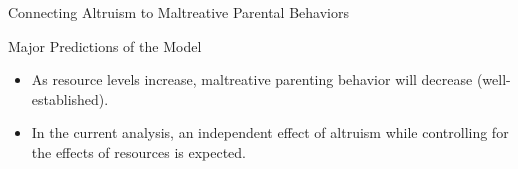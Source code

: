 \documentclass[handout]{beamer}
\begin{document}
\begin{frame}{Connecting Altruism to Maltreative Parental Behaviors}


\end{frame}

\begin{frame}{Major Predictions of the Model}

\begin{itemize}[<+->]
\itemsep1pt\parskip0pt
\item
  As resource levels increase, maltreative parenting behavior will
  decrease (well-established).
\end{itemize}

\begin{itemize}[<+->]
\itemsep1pt\parskip0pt
\item
  In the current analysis, an independent effect of altruism while
  controlling for the effects of resources is expected.
\end{itemize}

\end{frame}
\end{document}
